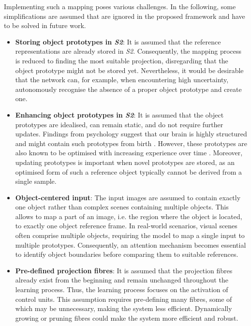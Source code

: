 Implementing such a mapping poses various challenges.
In the following, some simplifications are assumed that are ignored in the proposed framework and have to be solved in future work.
\begin{itemize}
    \item \textbf{Storing object prototypes in \emph{S2}}: It is assumed that the reference representations are already stored in \emph{S2}. Consequently, the mapping process is reduced to finding the most suitable projection, disregarding that the object prototype might not be stored yet. Nevertheless, it would be desirable that the network can, for example, when encountering high uncertainty, autonomously recognise the absence of a proper object prototype and create one.
    \item \textbf{Enhancing object prototypes in \emph{S2}}: It is assumed that the object prototypes are idealised, can remain static, and do not require further updates. 
    Findings from psychology suggest that our brain is highly structured and might contain such prototypes from birth . However, these prototypes are also known to be optimised with increasing experience over time \cite{simion_face_2015}.
    Moreover, updating prototypes is important when novel prototypes are stored, as an optimised form of such a reference object typically cannot be derived from a single sample.
    \item \textbf{Object-centered input}: The input images are assumed to contain exactly one object rather than complex scenes containing multiple objects. This allows to map a part of an image, i.e. the region where the object is located, to exactly one object reference frame. In real-world scenarios, visual scenes often comprise multiple objects, requiring the model to map a single input to multiple prototypes. Consequently, an attention mechanism becomes essential to identify object boundaries before comparing them to suitable references.
    \item \textbf{Pre-defined projection fibres}: It is assumed that the projection fibres already exist from the beginning and remain unchanged throughout the learning process. Thus, the learning process focuses on the activation of control units. This assumption requires pre-defining many fibres, some of which may be unnecessary, making the system less efficient. Dynamically growing or pruning fibres could make the system more efficient and robust.
\end{itemize}

